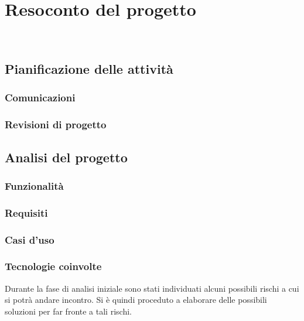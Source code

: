 
\chapter{Resoconto del progetto}
\label{cap:resoconto-progetto}

\\

\section{Pianificazione delle attività}
\subsection{Comunicazioni}
\subsection{Revisioni di progetto}

\section{Analisi del progetto}
\subsection{Funzionalità}
\subsection{Requisiti}
\subsection{Casi d'uso}
\subsection{Tecnologie coinvolte}

Durante la fase di analisi iniziale sono stati individuati alcuni possibili rischi a cui si potrà andare incontro.
Si è quindi proceduto a elaborare delle possibili soluzioni per far fronte a tali rischi.\\

